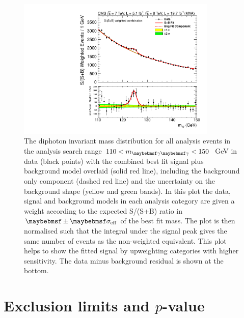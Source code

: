 \begin{figure}
  \includegraphics[width=0.85\textwidth]{results/plots/mgg_mva_110_150_combcat78TeV_weighted.pdf}
  \caption[The S/(S+B) weighted diphoton invariant mass distribution for all analysis events in data with the combined best fit signal plus background model overlaid]{The diphoton invariant mass distribution for all analysis events in the analysis search range $110<\mgg<150$~GeV in data (black points) with the combined best fit signal plus background model overlaid (solid red line), including the background only component (dashed red line) and the uncertainty on the background shape (yellow and green bands). In this plot the data, signal and background models in each analysis category are given a weight according to the expected S/(S+B) ratio in $\pm\sigeff$ of the best fit mass. The plot is then normalised such that the integral under the signal peak gives the same number of events as the non-weighted equivalent. This plot helps to show the fitted signal by upweighting categories with higher sensitivity. The data minus background residual is shown at the bottom.}
  \label{fig:sbfit_w}
\end{figure}

\section{Exclusion limits and $p$-value}

